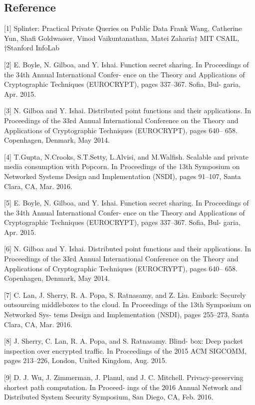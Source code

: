 \documentclass[12pt,a4paper]{article}
\begin{document}
\begin{multicols}{2}
\section{Reference}
[1] Splinter: Practical Private Queries on Public 
Data Frank Wang, Catherine Yun, Shafi Goldwasser, 
Vinod Vaikuntanathan, Matei Zaharia† MIT CSAIL, 
†Stanford InfoLab

[2] E. Boyle, N. Gilboa, and Y. Ishai. Function 
secret sharing. In Proceedings of the 34th Annual 
International Confer- ence on the Theory and 
Applications of Cryptographic Techniques 
(EUROCRYPT), pages 337–367. Sofia, Bul- garia, Apr. 
2015.

[3] N. Gilboa and Y. Ishai. Distributed point 
functions and their applications. In Proceedings of 
the 33rd Annual International Conference on the 
Theory and Applications of Cryptographic Techniques 
(EUROCRYPT), pages 640– 658. Copenhagen, Denmark, 
May 2014.

[4] T.Gupta, N.Crooks, S.T.Setty, L.Alvisi, and  M.Walfish. Scalable and private media consumption with Popcorn. In Proceedings of the 13th Symposium on Networked Systems Design and Implementation (NSDI), pages 91–107, Santa Clara, CA, Mar. 2016.

[5] E. Boyle, N. Gilboa, and Y. Ishai. Function secret sharing. In Proceedings of the 34th Annual International Confer- ence on the Theory and Applications of Cryptographic Techniques (EUROCRYPT), pages 337–367. Sofia, Bul- garia, Apr. 2015.

[6] N. Gilboa and Y. Ishai. Distributed point functions and their applications. In Proceedings of the 33rd Annual International Conference on the Theory and Applications of Cryptographic Techniques (EUROCRYPT), pages 640– 658. Copenhagen, Denmark, May 2014.

[7] C. Lan, J. Sherry, R. A. Popa, S. Ratnasamy, and Z. Liu. Embark: Securely outsourcing middleboxes to the cloud. In Proceedings of the 13th Symposium on Networked Sys- tems Design and Implementation (NSDI), pages 255–273, Santa Clara, CA, Mar. 2016.

[8] J. Sherry, C. Lan, R. A. Popa, and S. Ratnasamy. Blind- box: Deep packet inspection over encrypted traffic. In Proceedings of the 2015 ACM SIGCOMM, pages 213–226, London, United Kingdom, Aug. 2015.

[9] D. J. Wu, J. Zimmerman, J. Planul, and J. C. Mitchell. Privacy-preserving shortest path computation. In Proceed- ings of the 2016 Annual Network and Distributed System Security Symposium, San Diego, CA, Feb. 2016.


\end{multicols}
\end{document}
